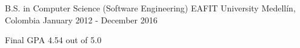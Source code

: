 \begin{cventries}
  \cventry
    {B.S. in Computer Science (Software Engineering)}
    {EAFIT University}
    {Medellín, Colombia}
    {January 2012 - December 2016}
    {
      \begin{cvitems}
        \item {Final GPA 4.54 out of 5.0}
      \end{cvitems}
    }
\end{cventries}
